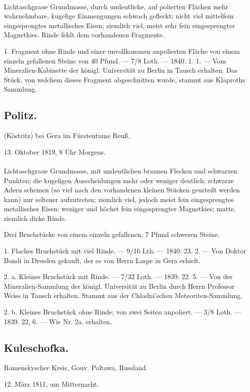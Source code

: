 \documentclass[a4paper, 11pt, oneside, polutonikogreek, german]{article}
\begin{document}
\paragraph{}
Lichtaschgraue Grundmasse, durch undeutliche, auf polierten Flächen mehr wahrnehmbare, kugelige Einmengungen schwach gefleckt; nicht viel mittelfein eingesprengtes metallisches Eisen; ziemlich viel, meist sehr fein eingesprengter Magnetkies. Rinde fehlt dem vorhandenen Fragmente.

1. Fragment ohne Rinde und einer unvollkommen anpolierten Fläche von einem einzeln gefallenen Steine von 40 Pfund. — 7/8 Loth. — 1840. 1. 1. — Vom Mineralien-Kabinette der königl. Universität zu Berlin in Tausch erhalten. Das Stück, von welchem dieses Fragment abgeschnitten wurde, stammt aus Klaproths Sammlung.
\subsection{Politz.}
\begin{center}
\small
(Köstritz) bei Gera im Fürstentume Reuß.

13. Oktober 1819, 8 Uhr Morgens.
\end{center}
\paragraph{}
Lichtaschgraue Grundmasse, mit undeutlichen braunen Flecken und schwarzen Punkten; die kugeligen Ausscheidungen mehr oder weniger deutlich; schwarze Adern scheinen (so viel nach den vorhandenen kleinen Stücken geurteilt werden kann) nur seltener aufzutreten; ziemlich viel, jedoch meist fein eingesprengtes metallisches Eisen; weniger und höchst fein eingesprengter Magnetkies; matte, ziemlich dicke Rinde.

Drei Bruchstücke von einem einzeln gefallenen, 7 Pfund schweren Steine.

1. Flaches Bruchstück mit viel Rinde. — 9/16 Lth. — 1840. 23. 2. — Von Doktor Bondi in Dresden gekauft, der es von Herrn Laspe in Gera erhielt.

2. a. Kleines Bruchstück mit Rinde. — 7/32 Loth. — 1839. 22. 5. — Von der Mineralien-Sammlung der königl. Universität zu Berlin durch Herrn Professor Weiss in Tausch erhalten. Stammt aus der Chladni'schen Meteoriten-Sammlung.

2. b. Kleines Bruchstück ohne Rinde; von zwei Seiten anpoliert. — 3/8 Loth. — 1839. 22, 6. — Wie Nr. 2a. erhalten.
\subsection{Kuleschofka.}
\begin{center}
\small
Romenskyscher Kreis, Gouv. Poltawa, Russland.

12. März 1811, um Mitternacht.
\end{center}
\end{document}
